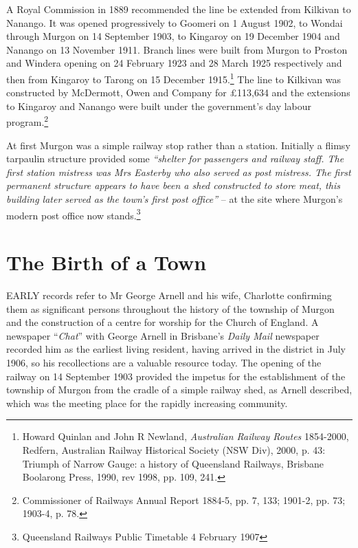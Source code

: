 A Royal Commission in 1889 recommended the line be extended from Kilkivan to Nanango. It was opened progressively to Goomeri on 1 August 1902, to Wondai through Murgon on 14 September 1903, to Kingaroy on 19 December 1904 and Nanango on 13 November 1911. Branch lines were built from Murgon to Proston and Windera opening on 24 February 1923 and 28 March 1925 respectively and then from Kingaroy to Tarong on 15 December 1915.\footnote{Howard Quinlan and John R Newland, \emph{Australian Railway Routes} 1854-2000, Redfern, Australian Railway Historical Society (NSW Div), 2000, p. 43: Triumph of Narrow Gauge: a history of Queensland Railways, Brisbane Boolarong Press, 1990, rev 1998, pp. 109, 241.} The line to Kilkivan was constructed by McDermott, Owen and Company for \pounds113,634 and the extensions to Kingaroy and Nanango were built under the government's day labour program.\footnote{Commissioner of Railways Annual Report 1884-5, pp. 7, 133; 1901-2, pp. 73; 1903-4, p. 78.}


At first Murgon was a simple railway stop rather than a station. Initially a flimsy tarpaulin structure provided some \emph{``shelter for passengers and railway staff. The first station mistress was Mrs Easterby who also served as post mistress. The first permanent structure appears to have been a shed constructed to store meat, this building later served as the town's first post office''} -- at the site where Murgon's modern post office now stands.\footnote{Queensland Railways Public Timetable 4 February 1907}


\balance


\printendnotes[custom]
\setcounter{endnote}{0}
\chapter{The Birth of a Town}
\nobalance


\lettrine[lines=3]{E}{ARLY}
 records refer to Mr George Arnell and his wife, Charlotte confirming them as significant persons throughout the history of the township of Murgon and the construction of a centre for worship for the Church of England. A newspaper ``\emph{Chat}'' with George Arnell in Brisbane's \emph{Daily Mail} newspaper recorded him as the earliest living resident\emph{,} having arrived in the district in July 1906, so his recollections are a valuable resource today. The opening of the railway on 14 September 1903 provided the impetus for the establishment of the township of Murgon from the cradle of a simple railway shed, as Arnell described, which was the meeting place for the rapidly increasing community.

